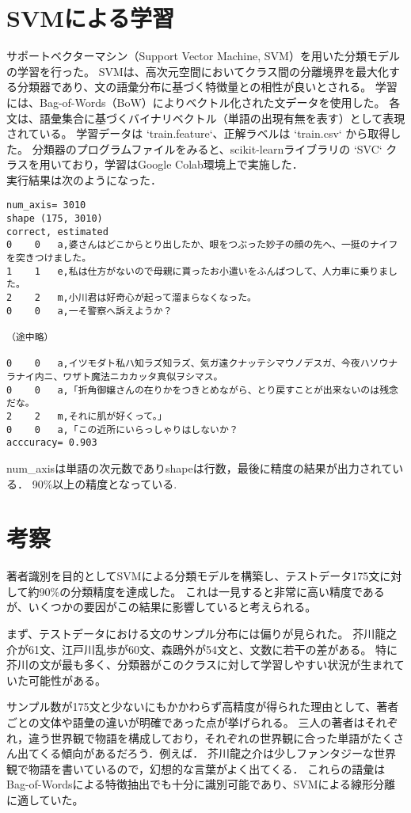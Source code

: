 \documentclass[autodetect-engine,dvi=dvipdfmx,ja=standard,
               a4j,11pt]{bxjsarticle}
\begin{document}
\section{SVMによる学習}
サポートベクターマシン（Support Vector Machine, SVM）を用いた分類モデルの学習を行った。
SVMは、高次元空間においてクラス間の分離境界を最大化する分類器であり、文の語彙分布に基づく特徴量との相性が良いとされる。
学習には、Bag-of-Words（BoW）によりベクトル化された文データを使用した。
各文は、語彙集合に基づくバイナリベクトル（単語の出現有無を表す）として表現されている。
学習データは `train.feature`、正解ラベルは `train.csv` から取得した。
分類器のプログラムファイルをみると、scikit-learnライブラリの `SVC` クラスを用いており，学習はGoogle Colab環境上で実施した．\\
 実行結果は次のようになった．
\begin{verbatim}
num_axis= 3010
shape (175, 3010)
correct, estimated
0 	 0 	 a,婆さんはどこからとり出したか、眼をつぶった妙子の顔の先へ、一挺のナイフを突きつけました。
1 	 1 	 e,私は仕方がないので母親に貰ったお小遣いをふんぱつして、人力車に乗りました。
2 	 2 	 m,小川君は好奇心が起って溜まらなくなった。
0 	 0 	 a,一そ警察へ訴えようか？

（途中略）

0 	 0 	 a,イツモダト私ハ知ラズ知ラズ、気ガ遠クナッテシマウノデスガ、今夜ハソウナラナイ内ニ、ワザト魔法ニカカッタ真似ヲシマス。
0 	 0 	 a,「折角御嬢さんの在りかをつきとめながら、とり戻すことが出来ないのは残念だな。
2 	 2 	 m,それに肌が好くって。」
0 	 0 	 a,「この近所にいらっしゃりはしないか？
acccuracy= 0.903
\end{verbatim}
num\_axisは単語の次元数でありshapeは行数，最後に精度の結果が出力されている．
90\%以上の精度となっている.
\section{考察}
著者識別を目的としてSVMによる分類モデルを構築し、テストデータ175文に対して約90\%の分類精度を達成した。
これは一見すると非常に高い精度であるが、いくつかの要因がこの結果に影響していると考えられる。

まず、テストデータにおける文のサンプル分布には偏りが見られた。
芥川龍之介が61文、江戸川乱歩が60文、森鴎外が54文と、文数に若干の差がある。
特に芥川の文が最も多く、分類器がこのクラスに対して学習しやすい状況が生まれていた可能性がある。

サンプル数が175文と少ないにもかかわらず高精度が得られた理由として、著者ごとの文体や語彙の違いが明確であった点が挙げられる。
三人の著者はそれぞれ，違う世界観で物語を構成しており，それぞれの世界観に合った単語がたくさん出てくる傾向があるだろう．例えば．
芥川龍之介は少しファンタジーな世界観で物語を書いているので，幻想的な言葉がよく出てくる．
これらの語彙はBag-of-Wordsによる特徴抽出でも十分に識別可能であり、SVMによる線形分離に適していた。
\end{document}
